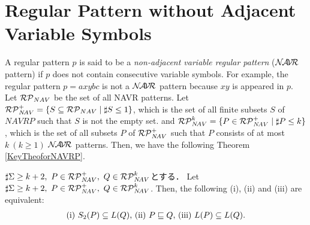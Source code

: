 \section{Regular Pattern without Adjacent Variable Symbols}

A regular pattern $p$ is said to be a {\it non-adjacent variable regular pattern} ($\mathcal{N\!A\!V\!R}$ pattern)  
if $p$ does not contain consecutive variable symbols.
For example, the regular pattern $p=axybc$ is not a $\mathcal{N\!A\!V\!R}$ pattern because $xy$ is appeared in $p$.
Let $\mathcal{RP}_{NAV}$ be the set of all NAVR patterns.
Let $\mathcal{RP}^{+}_{N\!AV}=\{S \subseteq \mathcal{RP}_{NAV} \mid \sharp S \leq 1\}$, which is the set of all finite subsets $S$ of $NAVRP$ such that $S$ is not the empty set.
and $\mathcal{RP}^{k}_{N\!AV}=\{P\in \mathcal{RP}^{+}_{N\!AV} \mid \sharp P \leq k\}$, which is the set of all subsets $P$ of $\mathcal{RP}^{+}_{N\!AV}$ such that $P$ consists of at most $k~(k\geq 1)$ $\mathcal{N\!A\!V\!R}$ patterns.
Then, we have the following Theorem \ref{KeyTheoforNAVRP}.

\begin{thm}\label{KeyTheoforNAVRP}%
  $\sharp \Sigma \ge k+2,~P\in \mathcal{RP}^{+}_{N\!AV},~Q \in \mathcal{RP}^{k}_{N\!AV}$とする．
Let $\sharp \Sigma \ge k+2,~P\in \mathcal{RP}^{+}_{N\!AV},~Q \in \mathcal{RP}^{k}_{N\!AV}$.  
Then, the following (i), (ii) and (iii) are equivalent:
\[
\begin{tabular}{ll}
$(\mathrm{i})$ $S_{2}(P) \subseteq L(Q)$,
$(\mathrm{ii})$ $P \sqsubseteq Q$,
$(\mathrm{iii})$ $L(P) \subseteq L(Q)$.
\end{tabular}
\]
\end{thm}

